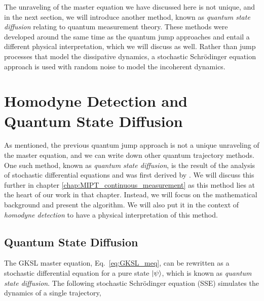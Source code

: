 The unraveling of the master equation we have discussed here is not unique, and in the next section, we will introduce another method, known as \textit{quantum state diffusion} relating to quantum measurement theory. These methods were developed around the same time \cite{gisin1992} as the quantum jump approaches and entail a different physical interpretation, which we will discuss as well. Rather than jump processes that model the dissipative dynamics, a stochastic Schr\"{o}dinger equation approach is used with random noise to model the incoherent dynamics.

\section{Homodyne Detection and Quantum State Diffusion}

As mentioned, the previous quantum jump approach is not a unique unraveling of the master equation, and we can write down other quantum trajectory methods. One such method, known as \textit{quantum state diffusion}, is the result of the analysis of stochastic differential equations and was first derived by \cite{gisin1992,wiseman1993}. We will discuss this further in chapter \ref{chap:MIPT_continuous_measurement} as this method lies at the heart of our work in that chapter. Instead, we will focus on the mathematical background and present the algorithm. We will also put it in the context of \textit{homodyne detection} to have a physical interpretation of this method.

\subsection{Quantum State Diffusion}
\label{subsec:qsd}
The GKSL master equation, Eq.~\ref{eq:GKSL_meq}, can be rewritten as a stochastic differential equation for a pure state $\ket{\psi}$, which is known as \textit{quantum state diffusion}. The following stochastic Schr\"{o}dinger equation (SSE) simulates the dynamics of a single trajectory,

